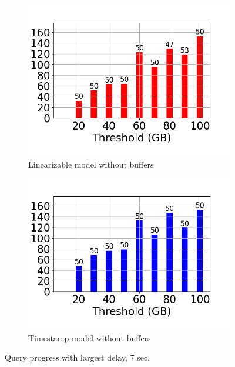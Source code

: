 \begin{figure}
\begin{subfigure}[c]{0.48\textwidth}
	\end{subfigure}
	\begin{subfigure}[c]{0.48\textwidth}
		\includegraphics[width=1\textwidth]   {figures/Experiments/Dynamic/Progress/7/average_query_time_per_batch_version_999777016_10485760_10_delay[7].png}
		\caption{Linearizable model without buffers}
		\label{fig:progress-queries-7-logical-no-buffers}
	\end{subfigure}
	\begin{subfigure}[c]{0.48\textwidth}
		\includegraphics[width=1\textwidth]   {figures/Experiments/Dynamic/Progress/7/average_query_time_per_batch_version_999777017_10485760_10_delay[7].png}
		\caption{Timestamp model without buffers}
		\label{fig:progress-queries-7-system-no-buffers}
	\end{subfigure}
	\caption{Query progress with largest delay, 7 sec.}
	\label{fig:query-progress-delay-7}
\end{figure}



